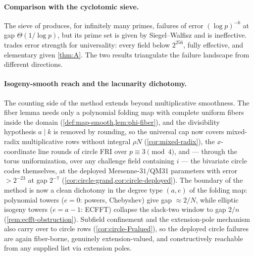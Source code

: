 \documentclass[11pt]{article}
\theoremstyle{definition}
\theoremstyle{remark}
\begin{document}
\paragraph{Comparison with the cyclotomic sieve.}
The sieve of \cite{Cho26a} produces, for infinitely many primes, failures of error $(\log p)^{-6}$ at gap $\Theta(1/\log p)$, but its prime set is given by Siegel--Walfisz and is ineffective.  trades error strength for universality: every field below $2^{256}$, fully effective, and elementary given \cref{thm:A}. The two results triangulate the failure landscape from different directions.

\paragraph{Isogeny-smooth reach and the lacunarity dichotomy.}
The counting side of the method extends beyond multiplicative smoothness. The fiber lemma needs only a polynomial folding map with complete uniform fibers inside the domain (\cref{def:map-smooth,lem:phi-fiber}), and the divisibility hypothesis $a\mid k$ is removed by rounding, so the universal cap now covers mixed-radix multiplicative rows without integral $\rho N$ (\cref{cor:mixed-radix}), the $x$-coordinate line rounds of circle FRI over $p\equiv3\pmod4$, and --- through the torus uniformization, over any challenge field containing $i$ --- the bivariate circle codes themselves, at the deployed Mersenne-$31$/QM31 parameters with error $>2^{-23}$ at gap $2^{-7}$ (\cref{cor:circle-grand,cor:circle-deployed}). The boundary of the method is now a clean dichotomy in the degree type $(a,e)$ of the folding map: polynomial towers ($e=0$: powers, Chebyshev) give gap $\approx2/N$, while elliptic isogeny towers ($e=a-1$: ECFFT) collapse the slack-two window to gap $2/n$ (\cref{rem:ecfft-obstruction}). Subfield confinement and the extension-pole mechanism also carry over to circle rows (\cref{cor:circle-Fvalued}), so the deployed circle failures are again fiber-borne, genuinely extension-valued, and constructively reachable from any supplied list via extension poles.
\end{document}
